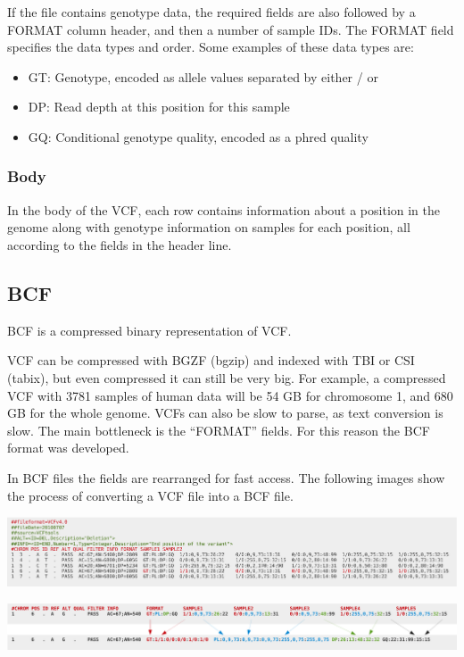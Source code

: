 \documentclass[11pt]{article}
\providecommand{\tightlist}{%
      \setlength{\itemsep}{0pt}\setlength{\parskip}{0pt}}
\begin{document}
If the file contains genotype data, the required fields are also
followed by a FORMAT column header, and then a number of sample IDs. The
FORMAT field specifies the data types and order. Some examples of these
data types are:

\begin{itemize}
\tightlist
\item
  GT: Genotype, encoded as allele values separated by either / or
  \textbar{}
\item
  DP: Read depth at this position for this sample
\item
  GQ: Conditional genotype quality, encoded as a phred quality
\end{itemize}

\hypertarget{body}{%
\subsubsection{Body}\label{body}}

In the body of the VCF, each row contains information about a position
in the genome along with genotype information on samples for each
position, all according to the fields in the header line.

\hypertarget{bcf}{%
\subsection{BCF}\label{bcf}}

BCF is a compressed binary representation of VCF.

VCF can be compressed with BGZF (bgzip) and indexed with TBI or CSI
(tabix), but even compressed it can still be very big. For example, a
compressed VCF with 3781 samples of human data will be 54 GB for
chromosome 1, and 680 GB for the whole genome. VCFs can also be slow to
parse, as text conversion is slow. The main bottleneck is the ``FORMAT''
fields. For this reason the BCF format was developed.

In BCF files the fields are rearranged for fast access. The following
images show the process of converting a VCF file into a BCF file.

    \includegraphics{img/VCF2.png}

    \includegraphics{img/VCF3.png}
\end{document}
